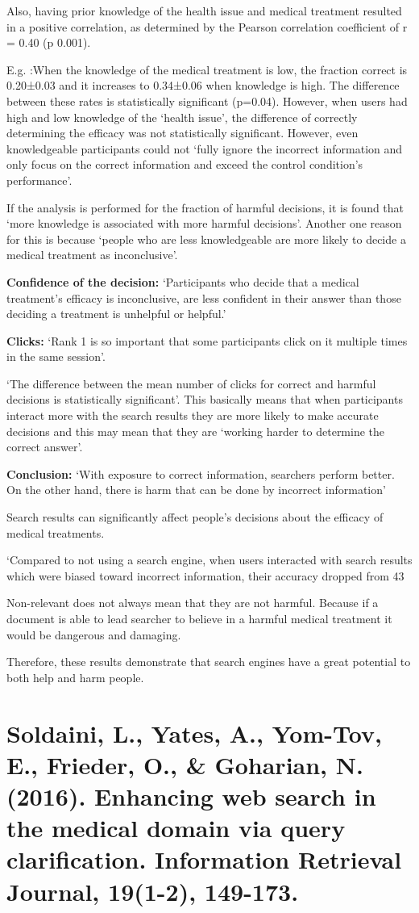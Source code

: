 \documentclass[]{article}
\begin{document}
Also, having prior knowledge of the health issue and medical treatment resulted in a positive correlation, as determined by the Pearson correlation coefficient of r = 0.40 (p 0.001).

E.g. :When the knowledge of the medical treatment is low, the fraction correct is 0.20±0.03 and it increases to 0.34±0.06 when knowledge is high. The difference between these rates is statistically significant (p=0.04). However, when users had high and low knowledge of the ‘health issue’, the difference of correctly determining the efficacy was not statistically significant. 
However, even knowledgeable participants could not ‘fully ignore the incorrect information and only focus on the correct information and exceed the control condition’s performance’.  

If the analysis is performed for the fraction of harmful decisions, it is found that ‘more knowledge is associated with more harmful decisions’. Another one reason for this is because ‘people who are less knowledgeable are more likely to decide a medical treatment as inconclusive’. 

\textbf{Confidence of the decision:} ‘Participants who decide that a medical treatment’s efficacy is inconclusive, are less confident in their answer than those deciding a treatment is unhelpful or helpful.’ 
 
\textbf{Clicks:} ‘Rank 1 is so important that some participants click on it multiple times in the same session’.

‘The difference between the mean number of clicks for correct and harmful decisions is statistically significant’. This basically means that when participants interact more with the search results they are more likely to make accurate decisions and this may mean that they are ‘working harder to determine the correct answer’.
 
\textbf{Conclusion:} ‘With exposure to correct information, searchers perform better. On the other hand, there is harm that can be done by incorrect information’

Search results can significantly affect people’s decisions about the efficacy of medical treatments.

‘Compared to not using a search engine, when users interacted with search results which were biased toward incorrect information, their accuracy dropped from 43%

Non-relevant does not always mean that they are not harmful. Because if a document is able to lead searcher to believe in a harmful medical treatment it would be dangerous and damaging. 
  
Therefore, these results demonstrate that search engines have a great potential to both help and harm people. 


\section{Soldaini, L., Yates, A., Yom-Tov, E., Frieder, O., & Goharian, N. (2016). Enhancing web search in the medical domain via query clarification. Information Retrieval Journal, 19(1-2), 149-173.}
\end{document}
